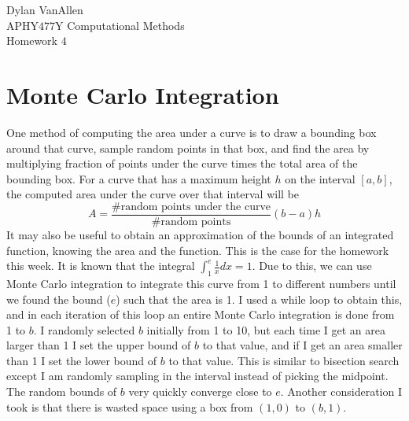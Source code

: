 \documentclass{article}
\begin{document}
\noindent
Dylan VanAllen\\
APHY$477$Y Computational Methods\\
Homework $4$
\bigskip

\section*{Monte Carlo Integration}
One method of computing the area under a curve is to draw a bounding box around that curve, sample random points in that box, and find the area by multiplying fraction of points under the curve times the total area of the bounding box. For a curve that has a maximum height $h$ on the interval $[a,b]$, the computed area under the curve  over that interval will be\begin{equation}
    A=\frac{\text{\# random points under the curve}}{\text{\# random points}}(b-a)h
\end{equation}
It may also be useful to obtain an approximation of the bounds of an integrated function, knowing the area and the function. This is the case for the homework this week. It is known that the integral $\int_1^e\frac{1}{x}dx = 1$. Due to this, we can use Monte Carlo integration to integrate this curve from 1 to different numbers until we found the bound ($e$) such that the area is 1. I used a while loop to obtain this, and in each iteration of this loop an entire Monte Carlo integration is done from 1 to $b$. I randomly selected $b$ initially from 1 to 10, but each time I get an area larger than 1 I set the upper bound of $b$ to that value, and if I get an area smaller than 1 I set the lower bound of $b$ to that value. This is similar to bisection search except I am randomly sampling in the interval instead of picking the midpoint. The random bounds of $b$ very quickly converge close to $e$. Another consideration I took is that there is wasted space using a box from $(1,0)$ to $(b,1)$. 
\end{document}
